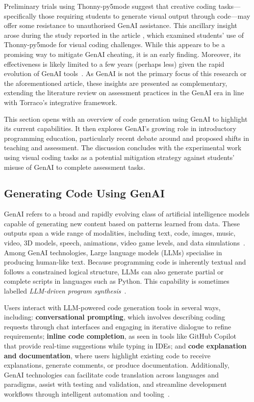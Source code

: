 Preliminary trials using Thonny-py5mode suggest that creative coding tasks---specifically those requiring students to generate visual output through code---may offer some resistance to unauthorised GenAI assistance. This ancillary insight arose during the study reported in the article \textit{}, which examined students' use of Thonny-py5mode for visual coding challenges. While this appears to be a promising way to mitigate GenAI cheating, it is an early finding. Moreover, its effectiveness is likely limited to a few years (perhaps less) given the rapid evolution of GenAI tools~\cite{ganguli_predictability_2022, grace_viewpoint_2018}. As GenAI is not the primary focus of this research or the aforementioned article, these insights are presented as complementary, extending the literature review on assessment practices in the GenAI era in line with Torraco's integrative framework.

This section opens with an overview of code generation using GenAI to highlight its current capabilities. It then explores GenAI's growing role in introductory programming education, particularly recent debate around and proposed shifts in teaching and assessment. The discussion concludes with the experimental work using visual coding tasks as a potential mitigation strategy against students' misuse of GenAI to complete assessment tasks.

\subsection{Generating Code Using GenAI}
\label{subsec:generating-code-using-genai}

GenAI refers to a broad and rapidly evolving class of artificial intelligence models capable of generating new content based on patterns learned from data. These outputs span a wide range of modalities, including text, code, images, music, video, 3D models, speech, animations, video game levels, and data simulations~\cite{foo_ai-generated_2025}. Among GenAI technologies, Large language models (LLMs) specialise in producing human-like text. Because programming code is inherently textual and follows a constrained logical structure, LLMs can also generate partial or complete scripts in languages such as Python. This capability is sometimes labelled \textit{LLM-driven program synthesis}~\cite{austin_program_2021}.

Users interact with LLM-powered code generation tools in several ways, including: \textbf{conversational prompting}, which involves describing coding requests through chat interfaces and engaging in iterative dialogue to refine requirements; \textbf{inline code completion}, as seen in tools like GitHub Copilot that provide real-time suggestions while typing in IDEs; and \textbf{code explanation and documentation}, where users highlight existing code to receive explanations, generate comments, or produce documentation. Additionally, GenAI technologies can facilitate code translation across languages and paradigms, assist with testing and validation, and streamline development workflows through intelligent automation and tooling~\cite{jiang_survey_2024, porter_learn_2024, taulli_ai-assisted_2024}.

